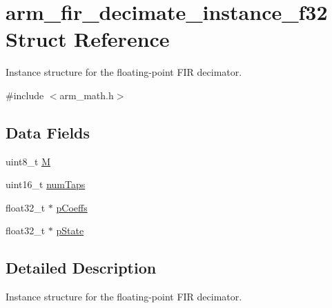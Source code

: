 \hypertarget{structarm__fir__decimate__instance__f32}{\section{arm\-\_\-fir\-\_\-decimate\-\_\-instance\-\_\-f32 Struct Reference}
\label{structarm__fir__decimate__instance__f32}
}


Instance structure for the floating-\/point F\-I\-R decimator.  




{\ttfamily \#include $<$arm\-\_\-math.\-h$>$}

\subsection*{Data Fields}
\begin{DoxyCompactItemize}
\item 
uint8\-\_\-t \hyperlink{structarm__fir__decimate__instance__f32_ae2c8107d00d3c9942e7a20fc598edecf}{M}
\item 
uint16\-\_\-t \hyperlink{structarm__fir__decimate__instance__f32_a751941891e47f522a7f5375fe8990aac}{num\-Taps}
\item 
float32\-\_\-t $\ast$ \hyperlink{structarm__fir__decimate__instance__f32_aacbb8dd8eeba4b21fc2bb40076405ee3}{p\-Coeffs}
\item 
float32\-\_\-t $\ast$ \hyperlink{structarm__fir__decimate__instance__f32_a335c87e6fdc4b96601d95a5de8b9c463}{p\-State}
\end{DoxyCompactItemize}


\subsection{Detailed Description}
Instance structure for the floating-\/point F\-I\-R decimator. 

